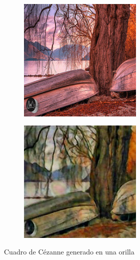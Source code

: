 \documentclass[[../main.tex]{subfiles}
\begin{document}
        \begin{figure}[!htb]
            \begin{subfigure}[b]{0.49\textwidth}
            \includegraphics[width=0.65\textwidth]{imagenes/imagen2cuadro/dataset/cezanne/2014-08-25 17_36_12.jpg}
            \end{subfigure}
        \hfill
            \begin{subfigure}[b]{0.49\textwidth}
            \includegraphics[width=0.65\textwidth]{imagenes/imagen2cuadro/dataset/cezanne/2014-08-25 17_36_12_2.jpg}
            \end{subfigure}
        \caption{Cuadro de Cézanne generado en una orilla}
        \label{fig:cezanne_cuadro_dataset_orilla}
        \end{figure}
        
\end{document}
